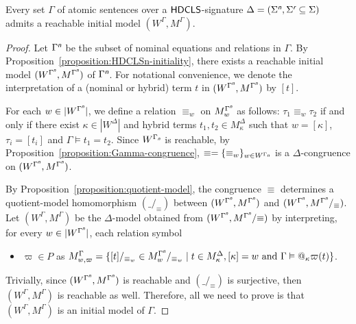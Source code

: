 \documentclass[a4paper,UKenglish,cleveref,autoref]{lipics-v2019}
\begin{document}
\begin{theorem} 
  \label{theorem:HDCLS0-initiality}
  Every set\/ $\Gamma$ of atomic sentences over a ${\mathsf{HDCLS}}$-signature $\Delta = (\Sigma^{\text{\normalfont\sffamily\itshape n}}, \Sigma^{\text{\normalfont\sffamily\itshape r}} \subseteq \Sigma)$ admits a reachable initial model $(W^{\Gamma}, M^{\Gamma})$.
\end{theorem}
\begin{proof}
  Let $\Gamma^{\text{\normalfont\sffamily\itshape n}}$ be the subset of nominal equations and relations in $\Gamma$.
  By Proposition~\ref{proposition:HDCLSn-initiality}, there exists a reachable initial model $(W^{\Gamma^{\text{\normalfont\sffamily\itshape n}}}, M^{\Gamma^{\text{\normalfont\sffamily\itshape n}}})$ of $\Gamma^{\text{\normalfont\sffamily\itshape n}}$.
  For notational convenience, we denote the interpretation of a (nominal or hybrid) term $t$ in $(W^{\Gamma^{\text{\normalfont\sffamily\itshape n}}}, M^{\Gamma^{\text{\normalfont\sffamily\itshape n}}})$ by $[t]$.

  For each $w \in |W^{\Gamma^{\text{\normalfont\sffamily\itshape n}}}|$, we define a relation $\equiv_{w}$ on $M^{\Gamma^{\text{\normalfont\sffamily\itshape n}}}_{w}$ as follows:
  $\tau_{1} \equiv_{w} \tau_{2}$ if and only if there exist $\kappa\in|W^\Delta|$ and hybrid terms $t_{1}, t_{2} \in M^{\Delta}_{\kappa}$ such that $w = [\kappa]$, $\tau_{i} = [t_{i}]$ and $\Gamma \models t_{1} = t_{2}$.
  Since $W^{\Gamma_{\text{\normalfont\sffamily\itshape n}}}$ is reachable, by Proposition~\ref{proposition:Gamma-congruence}, $\equiv=\{\equiv_w\}_{w\in W^{\Gamma_{\text{\normalfont\sffamily\itshape n}}}}$ is a $\Delta$-congruence on $(W^{\Gamma^{\text{\normalfont\sffamily\itshape n}}}, M^{\Gamma^{\text{\normalfont\sffamily\itshape n}}})$.

  By Proposition~\ref{proposition:quotient-model}, the congruence $\equiv$ determines a quotient-model homomorphism $(\_ /_{\equiv})$ between  $(W^{\Gamma^{\text{\normalfont\sffamily\itshape n}}}, M^{\Gamma^{\text{\normalfont\sffamily\itshape n}}})$ and $(W^{\Gamma^{\text{\normalfont\sffamily\itshape n}}}, M^{\Gamma^{\text{\normalfont\sffamily\itshape n}}}/_{\equiv})$.
  Let $(W^{\Gamma}, M^{\Gamma})$ be the $\Delta$-model obtained from $(W^{\Gamma^{\text{\normalfont\sffamily\itshape n}}}, M^{\Gamma^{\text{\normalfont\sffamily\itshape n}}}/{\equiv})$ by interpreting, for every $w \in |W^{\Gamma^{\text{\normalfont\sffamily\itshape n}}}|$, each relation symbol
  \begin{itemize}
  \item $\varpi \in P$ as $M^{\Gamma}_{w, \varpi} = \{[t]/_{\equiv_{w}} \in M^{\Gamma^{\text{\normalfont\sffamily\itshape n}}}_{w}/_{\equiv_{w}} \mid t \in M^{\Delta}_{\kappa}, [\kappa] = w \text{ and } \Gamma \vDash @_\kappa\varpi(t)\}$.
  \end{itemize}
  Trivially, since $(W^{\Gamma^{\text{\normalfont\sffamily\itshape n}}}, M^{\Gamma^{\text{\normalfont\sffamily\itshape n}}})$ is reachable and $(\_ /_{\equiv})$ is surjective, then $(W^{\Gamma}, M^{\Gamma})$ is reachable as well.
  Therefore, all we need to prove is that $(W^{\Gamma}, M^{\Gamma})$ is an initial model of $\Gamma$.


\end{proof}
\end{document}
